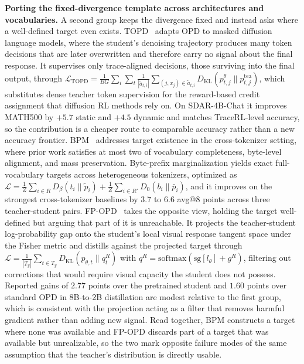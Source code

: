 \documentclass{article} %
\newcommand{\KL}{D_{\mathrm{KL}}}
\newcommand{\loss}{\mathcal{L}}
\begin{document}
\textbf{Porting the fixed-divergence template across architectures and vocabularies.} A second group keeps the divergence fixed and instead asks where a well-defined target even exists. TOPD~\citep{2607.16872} adapts OPD to masked diffusion language models, where the student's denoising trajectory produces many token decisions that are later overwritten and therefore carry no signal about the final response. It supervises only trace-aligned decisions, those surviving into the final output, through $\loss_{\mathrm{TOPD}} = \frac{1}{BG}\sum_i \sum_t \frac{1}{|\tilde a_{t,i}|} \sum_{(j,x_j) \in \tilde a_{t,i}} \KL(p^{\theta}_{t,j} \parallel p^{\mathrm{tea}}_{t,j})$, which substitutes dense teacher token supervision for the reward-based credit assignment that diffusion RL methods rely on. On SDAR-4B-Chat it improves MATH500 by $+5.7$ static and $+4.5$ dynamic and matches TraceRL-level accuracy, so the contribution is a cheaper route to comparable accuracy rather than a new accuracy frontier. BPM~\citep{2607.22334} addresses target existence in the cross-tokenizer setting, where prior work satisfies at most two of vocabulary completeness, byte-level alignment, and mass preservation. Byte-prefix marginalization yields exact full-vocabulary targets across heterogeneous tokenizers, optimized as $\loss = \frac{1}{Z}\sum_{i \in R} D_\beta(t_i \parallel \tilde p_i) + \frac{1}{Z}\sum_{i \in R'} D_0(b_i \parallel \bar p_i)$, and it improves on the strongest cross-tokenizer baselines by $3.7$ to $6.6$ avg@8 points across three teacher-student pairs. FP-OPD~\citep{2608.01263} takes the opposite view, holding the target well-defined but arguing that part of it is unreachable. It projects the teacher-student log-probability gap onto the student's local visual response tangent space under the Fisher metric and distills against the projected target through $\loss = \frac{1}{|T_y|}\sum_{t \in T_y} \KL(p_{\theta,t} \parallel q^R_t)$ with $q^R = \mathrm{softmax}(\mathrm{sg}[l_\theta] + g^R)$, filtering out corrections that would require visual capacity the student does not possess. Reported gains of $2.77$ points over the pretrained student and $1.60$ points over standard OPD in 8B-to-2B distillation are modest relative to the first group, which is consistent with the projection acting as a filter that removes harmful gradient rather than adding new signal. Read together, BPM constructs a target where none was available and FP-OPD discards part of a target that was available but unrealizable, so the two mark opposite failure modes of the same assumption that the teacher's distribution is directly usable.
\end{document}
